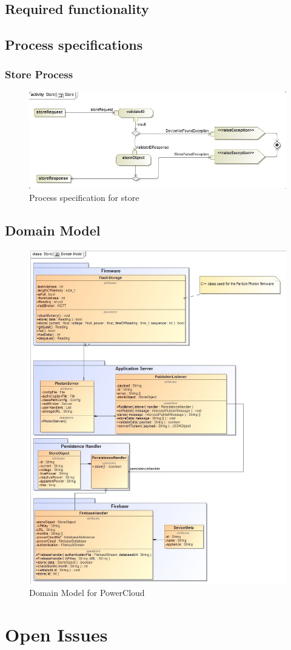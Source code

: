 \documentclass{article}
\begin{document}
	\subsection{Required functionality}
	\subsection{Process specifications}
	\subsubsection{Store Process}
	\begin{figure}[ht]
		\includegraphics[width=\textwidth]{images/Store.jpg}
		\caption{Process specification for store \label{overflow}}
	\end{figure}
	\clearpage
	\subsection{Domain Model}
	\begin{figure}[ht]
		\includegraphics[width=\textwidth]{images/Domain Model.jpg}
		\caption{Domain Model for PowerCloud \label{overflow}}
	\end{figure}
	\clearpage
	\section{Open Issues}
\end{document}
